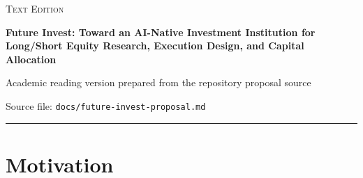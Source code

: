 \documentclass[11pt]{article}
\begin{document}
\begin{center}
{\small\textsc{\textcolor{fiBlue}{Text Edition}}}\par
\vspace{0.5em}
{\LARGE\bfseries Future Invest: Toward an AI-Native Investment Institution for Long/Short Equity Research, Execution Design, and Capital Allocation\par}
\vspace{0.75em}
{\normalsize Academic reading version prepared from the repository proposal source\par}
\vspace{0.35em}
{\small \textcolor{fiSlate}{Source file: \texttt{docs/future-invest-proposal.md}}}
\end{center}

\vspace{0.8em}
\hrule
\vspace{1em}

\begin{abstract}
This proposal introduces \textbf{Future Invest}, an AI-native investment institution designed for long/short equity research, execution design, and portfolio-aware capital allocation. The central argument is that current multi-agent finance systems remain too close to human organizational charts: they are interpretable, but they are often static, weakly capital-aware, and effectively stateless across runs. Future Invest addresses this gap by combining four design elements within a unified operating system: capability-native research modules, institution-level orchestration, front-loaded portfolio constraints, and durable institutional memory. Instead of asking isolated agents to produce disconnected reports, the system coordinates a shared dossier that integrates business truth, market expectations, timing, catalysts, execution planning, and capital allocation logic. The proposal advances the hypothesis that such a system will generate more coherent, more portfolio-aware, and more testable investment decisions than both static role-based multi-agent baselines and simplified single-agent baselines. The repository already contains a working runtime, a batch evaluation harness, and persistent memory infrastructure, allowing the proposal to be evaluated not only as a conceptual design but also as an empirical systems contribution.
\end{abstract}

\section{Motivation}
\end{document}

